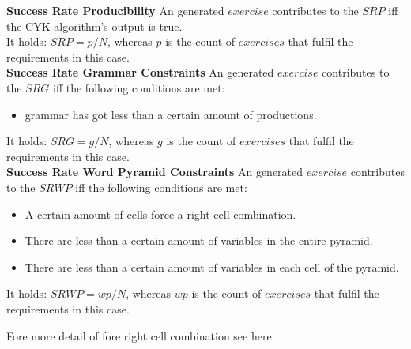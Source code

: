 \noindent\textbf{Success Rate Producibility}
An generated $exercise$ contributes to the $SRP$ iff the CYK algorithm's output is true.\\
It holds: $SRP = p / N$, whereas $p$ is the count of $exercises$ that fulfil the requirements in this case.\\

\noindent\textbf{Success Rate Grammar Constraints}
An generated $exercise$ contributes to the $SRG$ iff the following conditions are met:
\begin{itemize}
	\item grammar has got less than a certain amount of productions.
\end{itemize}
It holds: $SRG = g / N$, whereas $g$ is the count of $exercises$ that fulfil the requirements in this case.\\

\noindent\textbf{Success Rate Word Pyramid Constraints}
An generated $exercise$ contributes to the $SRWP$ iff the following conditions are met:
\begin{itemize}
	\item A certain amount of cells force a right cell combination.
	\item There are less than a certain amount of variables in the entire pyramid.
	\item There are less than a certain amount of variables in each cell of the pyramid.
\end{itemize}
It holds: $SRWP = wp / N$, whereas $wp$ is the count of $exercises$ that fulfil the requirements in this case.
\pagebreak

\noindent Fore more detail of fore right cell combination see here:\\

\noindent 
{}


\pagebreak